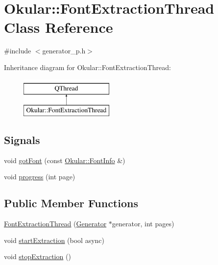 \hypertarget{classOkular_1_1FontExtractionThread}{\section{Okular\+:\+:Font\+Extraction\+Thread Class Reference}
\label{classOkular_1_1FontExtractionThread}
}


{\ttfamily \#include $<$generator\+\_\+p.\+h$>$}

Inheritance diagram for Okular\+:\+:Font\+Extraction\+Thread\+:\begin{figure}[H]
\begin{center}
\leavevmode
\includegraphics[height=2.000000cm]{classOkular_1_1FontExtractionThread}
\end{center}
\end{figure}
\subsection*{Signals}
\begin{DoxyCompactItemize}
\item 
void \hyperlink{classOkular_1_1FontExtractionThread_a4f6520af71a7109605f22d8f4b2dae6f}{got\+Font} (const \hyperlink{classOkular_1_1FontInfo}{Okular\+::\+Font\+Info} \&)
\item 
void \hyperlink{classOkular_1_1FontExtractionThread_a47990afa612a4a9b28d6deab4fad13d6}{progress} (int page)
\end{DoxyCompactItemize}
\subsection*{Public Member Functions}
\begin{DoxyCompactItemize}
\item 
\hyperlink{classOkular_1_1FontExtractionThread_ac98fba33d1042933e1696a29840f6644}{Font\+Extraction\+Thread} (\hyperlink{classOkular_1_1Generator}{Generator} $\ast$generator, int pages)
\item 
void \hyperlink{classOkular_1_1FontExtractionThread_ae2fb07f04f7fa0eac709edfc6a1cbe9e}{start\+Extraction} (bool async)
\item 
void \hyperlink{classOkular_1_1FontExtractionThread_abe3b99a85a836d32b367179baeacec78}{stop\+Extraction} ()
\end{DoxyCompactItemize}
